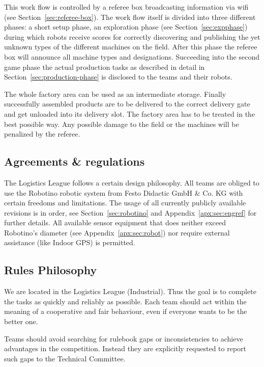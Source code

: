 \documentclass[12pt,twoside]{article}
\newcommand{\refsec}[1]{Section~\ref{#1}}
\begin{document}
This work flow is controlled by a referee box broadcasting information
via wifi (see \refsec{sec:referee-box}). The work flow itself is
divided into three different phases: a short setup phase, an
exploration phase (see \refsec{sec:expphase}) during which robots
receive scores for correctly discovering and publishing the yet
unknown types of the different machines on the field. After this phase
the referee box will announce all machine types and
designations. Succeeding into the second game phase the actual
production tasks as described in detail in
\refsec{sec:production-phase} is disclosed to the teams and their
robots.

The whole factory area can be used as an intermediate storage. Finally
successfully assembled products are to be delivered to the correct
delivery gate and get unloaded into its delivery slot. The factory area
has to be treated in the best possible way. Any possible damage to the
field or the machines will be penalized by the referee.

\subsection{Agreements \& regulations} \label{sec:agreements}

The Logistics League follows a certain design philosophy. All teams
are obliged to use the Robotino robotic system from Festo Didactic
GmbH \& Co. KG with certain freedoms and limitations. The usage of all
currently publicly available revisions is in order, see
\refsec{sec:robotino} and Appendix~\ref{apx:sec:engref} for further
details. All available sensor equipment that does neither exceed
Robotino's diameter (see Appendix~\ref{apx:sec:robot}) nor require
external assistance (like Indoor GPS) is permitted.


\subsection{Rules Philosophy}

We are located in the Logistics League (Industrial). Thus the goal is to complete the tasks as quickly and reliably as possible. Each team should act within the meaning of a cooperative and fair behaviour, even if everyone wants to be the better one.

Teams should avoid searching for rulebook gaps or inconsistencies to achieve advantages in the competition. Instead they are explicitly requested to report such gaps to the Technical Committee.
\end{document}
